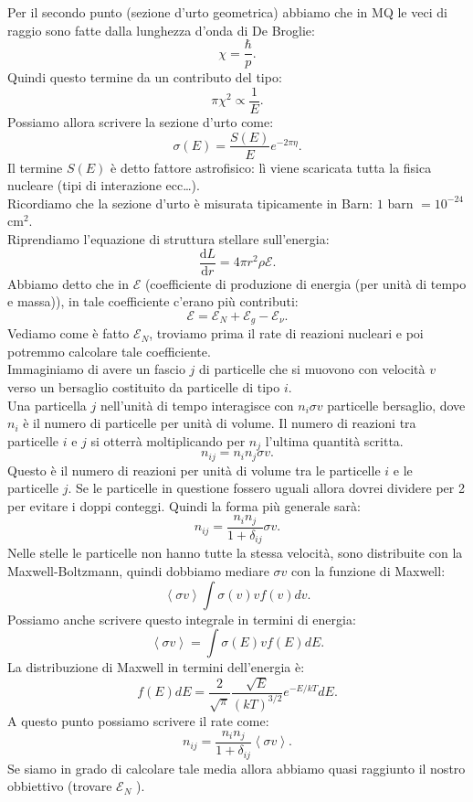 Per il secondo punto (sezione d'urto geometrica) abbiamo che in MQ le veci di raggio sono fatte dalla lunghezza d'onda di De Broglie:
\[
\chi = \frac{\hbar }{p}
.\] 
Quindi questo termine da un contributo del tipo:
\[
\pi\chi^2 \propto \frac{1}{E}
.\] 
Possiamo allora scrivere la sezione d'urto come:
\[
    \sigma (E) = \frac{S(E)}{E}e^{-2\pi\eta}
.\] 
Il termine $S(E)$ è detto fattore astrofisico: lì viene scaricata tutta la fisica nucleare (tipi di interazione ecc\ldots).\\
Ricordiamo che la sezione d'urto è misurata tipicamente in Barn: $1$ barn $=10^{-24}$ cm$^2$.\\
Riprendiamo l'equazione di struttura stellare sull'energia:
\[
\frac{\text{d} L}{\text{d} r} = 4\pi r^2\rho\mathcal{E}
.\] 
Abbiamo detto che in $\mathcal{E}$ (coefficiente di produzione di energia (per unità di tempo e massa)), in tale coefficiente c'erano più contributi:
\[
\mathcal{E} =\mathcal{E}_N+\mathcal{E}_g-\mathcal{E}_\nu
.\] 
Vediamo come è fatto $\mathcal{E}_N$, troviamo prima il rate di reazioni nucleari e poi potremmo calcolare tale coefficiente. \\
Immaginiamo di avere un fascio $j$  di particelle che si muovono con velocità $v$ verso un bersaglio costituito da particelle di tipo $i$. \\
Una particella $j$ nell'unità di tempo interagisce con $n_i\sigma v$ particelle bersaglio, dove $n_i$ è il numero di particelle per unità di volume. Il numero di reazioni tra particelle $i$ e $j$ si otterrà moltiplicando per $n_j$ l'ultima quantità scritta.
\[
n_{ij}=n_in_j\sigma v
.\] 
Questo è il numero di reazioni per unità di volume tra le particelle $i$ e le particelle $j$. Se le particelle in questione fossero uguali allora dovrei dividere per 2 per evitare i doppi conteggi. Quindi la forma più generale sarà:
\[
n_{ij}=\frac{n_in_j}{1+\delta_{ij}}\sigma v
.\]
Nelle stelle le particelle non hanno tutte la stessa velocità, sono distribuite con la Maxwell-Boltzmann, quindi dobbiamo mediare $\sigma v$  con la funzione di Maxwell:
\[
    \left<\sigma v\right>\int\sigma (v) v f(v) dv
.\] 
Possiamo anche scrivere questo integrale in termini di energia:
\[
    \left<\sigma v\right> = \int\sigma (E)vf(E) dE
.\] 
La distribuzione di Maxwell in termini dell'energia è:
\[
    f(E) dE = \frac{2}{\sqrt{\pi}}\frac{\sqrt{E}}{\left(kT\right)^{3 /2}}e^{- E /kT}dE
.\] 
A questo punto possiamo scrivere il rate come:
\[
n_{ij}= \frac{n_in_j}{1+\delta_{ij}}\left<\sigma v\right>
.\] 
Se siamo in grado di calcolare tale media allora abbiamo quasi raggiunto il nostro obbiettivo (trovare $\mathcal{E}_N$ ). \\
